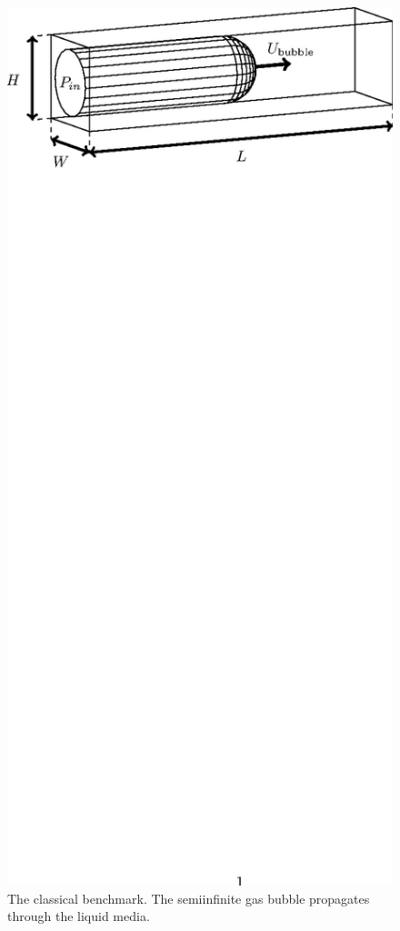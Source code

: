 \documentclass{article}
\begin{document}
\begin{figure}[ht]
\includegraphics[bb=152 638 406 718,width=\textwidth]{Figures/benchmark_classical.eps}
\caption{The classical benchmark. The semiinfinite gas bubble
propagates through the liquid media. \label{fig:classical:benchmark}}
\end{figure}
\end{document}

